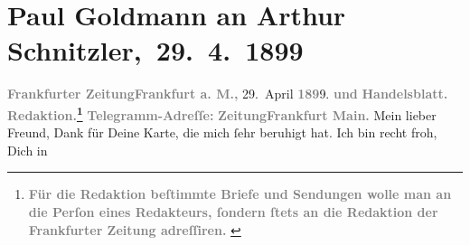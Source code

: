 

         
         \renewcommand{\erwaehntePersonen}{Personen: Alfred Dreyfus, Fedor Mamroth, Josef Rosengart, Vally Rosengart}
         \renewcommand{\erwaehnteInstitutionen}{Institutionen: Frankfurter Zeitung}
         \renewcommand{\erwaehnteOrte}{Orte: Berlin, Deutsches Theater Berlin, Frankfurt am Main, Wien}
         \renewcommand{\erwaehnteWerke}{Werke: Der grüne Kakadu – Paracelsus – Die Gefährtin. Drei Einakter}
               \section[ Paul Goldmann an Arthur Schnitzler, 29. 4. 1899]{ Paul Goldmann an Arthur Schnitzler, 29. 4. 1899}\nopagebreak{}\rehead{ }\begin{ledgroupsized}[t]{13cm}\normalsize\beginnumbering \toendnotes[C]{\smallbreak\pagebreak[2]} 
\toendnotes[C]{\smallbreak}\pstart
           \noindent{}{\pb}\textcolor{gray}{\textbf{\textbf{Frankfurter Zeitung}}}\hfill \textcolor{gray}{\textbf{\textbf{Frankfurt a.
                        M.,}}}{ }29. April \textcolor{gray}{\textbf{189}}9.\pend
           \pstart
           \textcolor{gray}{\textbf{und}}\pend
           \pstart
           \textcolor{gray}{\textbf{Handelsblatt.}}\pend
           \pstart
           \textcolor{gray}{\textbf{\textbf{Redaktion.}\footnote{\noindent{}\textcolor{gray}{\textbf{Für die Redaktion beſtimmte Briefe und Sendungen wolle man
                                  an die Perſon eines Redakteurs,
                              ſondern ſtets \textbf{an die Redaktion der Frankfurter Zeitung} adreſſiren. }}}}}\pend
           \pstart
           \textcolor{gray}{\textbf{Telegramm-Adreſſe:}}\pend
           \pstart
           \textcolor{gray}{\textbf{\textbf{ZeitungFrankfurt Main.}}}\pend
           \pstart{}Mein lieber Freund,\pend\pstart
           Dank für Deine Karte, die mich ſehr beruhigt hat. Ich bin recht froh, Dich in \label{K_L02873-1v}
\end{ledgroupsized}
